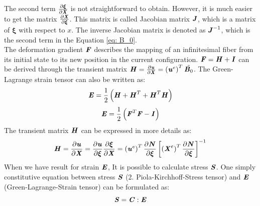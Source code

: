 The second term $\frac{\partial \boldsymbol{\xi}}{\partial \textbf{\textit{X}}}$ is not straightforward to obtain. However, it is much easier to get the matrix $\frac{\partial \textbf{\textit{X}}}{\partial \boldsymbol{\xi}}$. This matrix is called Jacobian matrix $\textbf{\textit{J}}$, which is a matrix of $\boldsymbol{\xi}$ with respect to $x$. The inverse Jacobian matrix is denoted as $\textbf{\textit{J}}^{-1}$, which is the second term in the Equation \ref{eq: B_0}. \\
The deformation gradient $\textbf{\textit{F}}$ describes the mapping of an infinitesimal fiber from its initial state to its new position in the current configuration.    $\textbf{\textit{F}} = \textbf{\textit{H}} + \textbf{\textit{I}}$ can be derived through the transient matrix $\textbf{\textit{H}} = \frac{\partial \textbf{\textit{u}}}{\partial \textbf{\textit{X}}} = \left(\textbf{\textit{u}}^e\right)^T \tilde{\textbf{\textit{B}}_0}$.  The Green-Lagrange strain tensor can also be written as:
\begin{equation}
\textbf{\textit{E}} = \frac{1}{2} \left(\textbf{\textit{H}} + \textbf{\textit{H}}^T + \textbf{\textit{H}}^T \textbf{\textit{H}}\right)
\end{equation}
\begin{equation} \label{eq: E_eq}
\textbf{\textit{E}} = \frac{1}{2} \left(\textbf{\textit{F}}^T \textbf{\textit{F}} - \textbf{\textit{I}}\right)
\end{equation}
The transient matrix $\textbf{\textit{H}}$ can be expressed in more details as:
\begin{equation} \label{eq: Help_matrix}
\textbf{\textit{H}} = \frac{\partial \textbf{\textit{u}}}{\partial \textbf{\textit{X}}} = \frac{\partial \textbf{\textit{u}}}{\partial \boldsymbol{\xi}} \frac{\partial \boldsymbol{\xi}}{\partial \textbf{\textit{X}}} = \left(\textbf{\textit{u}}^e\right)^T \frac{\partial \textbf{\textit{N}}}{\partial \boldsymbol{\xi}} \left[ \left(\textbf{\textit{X}}^e\right)^T \frac{\partial \textbf{\textit{N}}}{\partial \boldsymbol{\xi}}\right]^{-1}
\end{equation}
 When we have result for strain $\textbf{\textit{E}}$, It is possible to calculate stress $\textbf{\textit{S}}$. One simply constitutive equation between stress $\textbf{\textit{S}}$ (2. Piola-Kirchhoff-Stress tensor) and $\textbf{\textit{E}}$ (Green-Lagrange-Strain tensor) can be formulated as:
\begin{equation}
\textbf{\textit{S}} = \textbf{\textit{C}} : \textbf{\textit{E}}
\end{equation}
